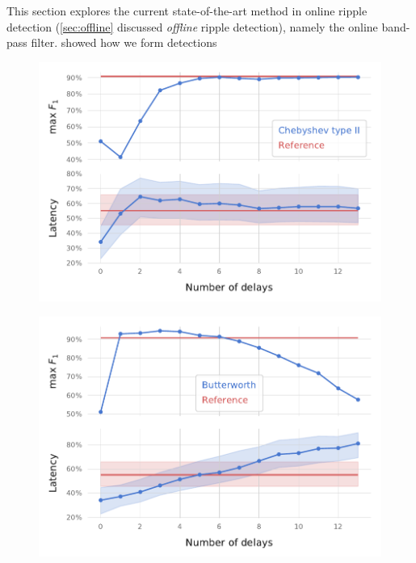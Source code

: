 \label{sec:SOTA}

This section explores the current state-of-the-art method in online ripple detection (\cref{sec:offline} discussed \emph{offline} ripple detection), namely the online band-pass filter.  showed how we form detections 

\clearpage
\begin{figure}
\includegraphics{figures/searcharray-cheby2}
\end{figure}

\begin{figure}
\includegraphics{figures/searcharray-butter}
\end{figure}
